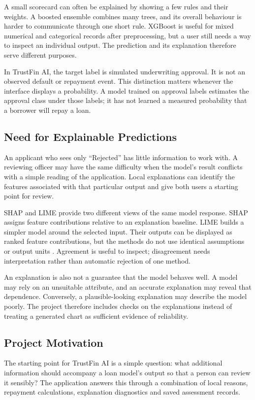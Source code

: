 A small scorecard can often be explained by showing a few rules and their weights. A boosted ensemble combines many trees, and its overall behaviour is harder to communicate through one short rule. XGBoost is useful for mixed numerical and categorical records after preprocessing, but a user still needs a way to inspect an individual output. The prediction and its explanation therefore serve different purposes.

In TrustFin AI, the target label is simulated underwriting approval. It is not an observed default or repayment event. This distinction matters whenever the interface displays a probability. A model trained on approval labels estimates the approval class under those labels; it has not learned a measured probability that a borrower will repay a loan.

\subsection{Need for Explainable Predictions}
An applicant who sees only ``Rejected'' has little information to work with. A reviewing officer may have the same difficulty when the model's result conflicts with a simple reading of the application. Local explanations can identify the features associated with that particular output and give both users a starting point for review.

SHAP and LIME provide two different views of the same model response. SHAP assigns feature contributions relative to an explanation baseline. LIME builds a simpler model around the selected input. Their outputs can be displayed as ranked feature contributions, but the methods do not use identical assumptions or output units \cite{lundberg2017,ribeiro2016}. Agreement is useful to inspect; disagreement needs interpretation rather than automatic rejection of one method.

An explanation is also not a guarantee that the model behaves well. A model may rely on an unsuitable attribute, and an accurate explanation may reveal that dependence. Conversely, a plausible-looking explanation may describe the model poorly. The project therefore includes checks on the explanations instead of treating a generated chart as sufficient evidence of reliability.

\subsection{Project Motivation}
The starting point for TrustFin AI is a simple question: what additional information should accompany a loan model's output so that a person can review it sensibly? The application answers this through a combination of local reasons, repayment calculations, explanation diagnostics and saved assessment records.

